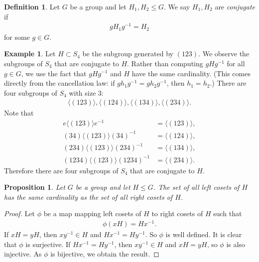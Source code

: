 \documentclass[12pt]{report}
\theoremstyle{plain}
\newtheorem{proposition}[theorem]{Proposition}
\theoremstyle{remark}
\theoremstyle{definition}
\newtheorem{definition}[theorem]{Definition}
\newtheorem{example}[theorem]{Example}
\begin{document}
\begin{definition}
    Let $G$ be a group and let $H_1,H_2\le G$. We say $H_1,H_2$ are \emph{conjugate} if
    \begin{align*}
        gH_1 g^{-1}=H_2
    \end{align*}
    for some $g\in G$.
\end{definition}

\begin{example}
    Let $H\subset S_4$ be the subgroup generated by $(123)$. We observe the subgroups of $S_4$ that are conjugate to $H$. Rather than computing $gHg^{-1}$ for all $g\in G$, we use the fact that $gHg^{-1}$ and $H$ have the same cardinality. (This comes directly from the cancellation law: if $gh_1g^{-1} = gh_2 g^{-1}$, then $h_1=h_2$.) There are four subgroups of $S_4$ with size $3$:
    \begin{align*}
        \langle(123)\rangle, \langle(124)\rangle, \langle(134)\rangle, \langle(234)\rangle.
    \end{align*}
    Note that
    \begin{align*}
        e\langle(123)\rangle e^{-1} &= \langle(123)\rangle, \\
        (34)\langle(123)\rangle(34)^{-1} &= \langle(124)\rangle, \\
        (234)\langle(123)\rangle(234)^{-1} &= \langle(134)\rangle, \\
        (1234)\langle(123)\rangle(1234)^{-1} &= \langle(234)\rangle.
    \end{align*}
    Therefore there are four subgroups of $S_4$ that are conjugate to $H$.
\end{example}

\begin{proposition}
    Let $G$ be a group and let $H\le G$. The set of all left cosets of $H$ has the same cardinality as the set of all right cosets of $H$.
\end{proposition}
\begin{proof}
    Let $\phi$ be a map mapping left cosets of $H$ to right cosets of $H$ such that
    \begin{align*}
        \phi(xH)=Hx^{-1}.
    \end{align*}
    If $xH=yH$, then $xy^{-1}\in H$ and $Hx^{-1} = Hy^{-1}$. So $\phi$ is well defined. It is clear that $\phi$ is surjective. If $Hx^{-1} = Hy^{-1}$, then $xy^{-1}\in H$ and $xH=yH$, so $\phi$ is also injective. As $\phi$ is bijective, we obtain the result.
\end{proof}
\end{document}
